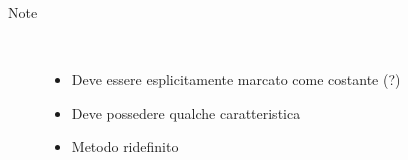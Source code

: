 \begin{description}
\begin{description}
\begin{description}
\begin{itemize}
				\end{itemize}
			\item[Note] \hfill \\
			\begin{itemize}
					\item Deve essere esplicitamente marcato come costante (?)
					\item Deve possedere qualche caratteristica
					\item Metodo ridefinito
			\end{itemize}
		\end{description}
	\end{description}

\end{description}
